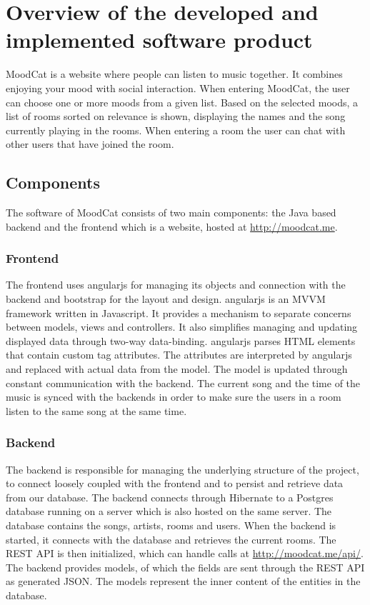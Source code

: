 \chapter{Overview of the developed and implemented software product}
\label{ch:overview}

MoodCat is a website where people can listen to music together.
It combines enjoying your mood with social interaction.
When entering MoodCat, the user can choose one or more moods from a given list.
Based on the selected moods, a list of rooms sorted on relevance is shown, displaying the names and the song currently playing in the rooms. 
When entering a room the user can chat with other users that have joined the room.

\section{Components}
The software of MoodCat consists of two main components: the Java based backend and the frontend which is a website,
hosted at \url{http://moodcat.me}.

\subsection{Frontend}
The frontend uses \gls{angularjs} for managing its objects and connection with the backend and bootstrap for the layout and design.
\gls{angularjs} is an \gls{MVVM} framework written in Javascript.
It provides a mechanism to separate concerns between models, views and controllers.
It also simplifies managing and updating displayed data through two-way \gls{data-binding}.
\gls{angularjs} parses \gls{HTML} elements that contain custom tag attributes.
The attributes are interpreted by \gls{angularjs} and replaced with actual data from the model.
The model is updated through constant communication with the backend.
The current song and the time of the music is synced with the backends in order to make sure the users in a room listen to the same song at the same time.

\subsection{Backend}
The backend is responsible for managing the underlying structure of the project, to connect loosely coupled with the frontend and to persist and retrieve data from our database.
The backend connects through \gls{Hibernate} to a \gls{Postgres} database running on a server which is also hosted on the same server.
The database contains the songs, artists, rooms and users.
When the backend is started, it connects with the database and retrieves the current rooms.
The \gls{REST} API is then initialized, which can handle calls at \url{http://moodcat.me/api/}.
The backend provides models, of which the fields are sent through the \gls{REST} API as generated \gls{JSON}.
The models represent the inner content of the entities in the database.


